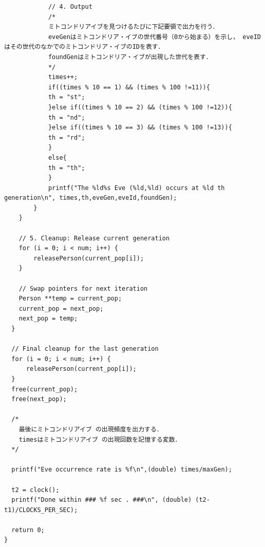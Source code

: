 \documentclass[a4paper,11pt]{jsarticle}
\begin{document}
\begin{small}
\begin{verbatim}
            // 4. Output
            /*
            ミトコンドリアイブを見つけるたびに下記要領で出力を行う．
            eveGenはミトコンドリア・イブの世代番号（0から始まる）を示し， eveIDはその世代のなかでのミトコンドリア・イブのIDを表す．
            foundGenはミトコンドリア・イブが出現した世代を表す．
            */ 
            times++;
            if((times % 10 == 1) && (times % 100 !=11)){
            th = "st";
            }else if((times % 10 == 2) && (times % 100 !=12)){
            th = "nd";
            }else if((times % 10 == 3) && (times % 100 !=13)){
            th = "rd";
            }
            else{
            th = "th";
            }
            printf("The %ld%s Eve (%ld,%ld) occurs at %ld th generation\n", times,th,eveGen,eveId,foundGen);
        }
    }

    // 5. Cleanup: Release current generation
    for (i = 0; i < num; i++) {
        releasePerson(current_pop[i]);
    }

    // Swap pointers for next iteration
    Person **temp = current_pop;
    current_pop = next_pop;
    next_pop = temp;
  }
  
  // Final cleanup for the last generation
  for (i = 0; i < num; i++) {
      releasePerson(current_pop[i]);
  }
  free(current_pop);
  free(next_pop);

  /*
    最後にミトコンドリアイブ の出現頻度を出力する．
    timesはミトコンドリアイブ の出現回数を記憶する変数． 
  */

  printf("Eve occurrence rate is %f\n",(double) times/maxGen);

  t2 = clock();
  printf("Done within ### %f sec . ###\n", (double) (t2-t1)/CLOCKS_PER_SEC);
  
  return 0;
}

\end{verbatim}
\end{small}
\end{document}
